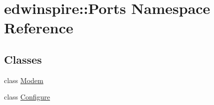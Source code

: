 \hypertarget{namespaceedwinspire_1_1Ports}{\section{edwinspire\-:\-:Ports Namespace Reference}
\label{namespaceedwinspire_1_1Ports}
}
\subsection*{Classes}
\begin{DoxyCompactItemize}
\item 
class \hyperlink{classedwinspire_1_1Ports_1_1Modem}{Modem}
\item 
class \hyperlink{classedwinspire_1_1Ports_1_1Configure}{Configure}
\end{DoxyCompactItemize}
